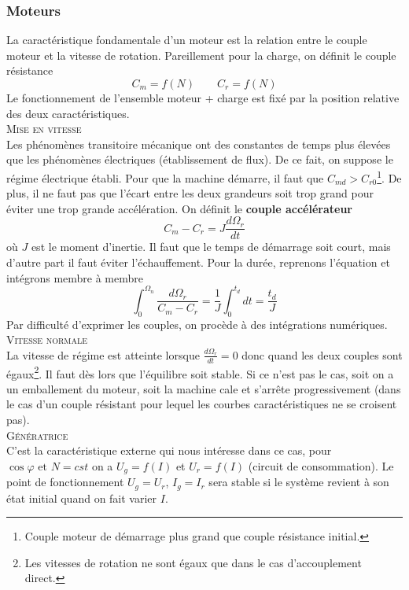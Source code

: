 		\subsubsection{Moteurs}
			La caractéristique fondamentale d'un moteur est la relation entre le couple moteur et la vitesse de rotation. Pareillement pour la charge, on définit le couple résistance 
			\begin{equation}
				C_m = f(N) \qquad C_r = f(N)
			\end{equation}
			Le fonctionnement de l'ensemble moteur + charge est fixé par la position relative des deux caractéristiques. \\
			
			\textsc{Mise en vitesse}\\
				Les phénomènes transitoire mécanique ont des constantes de temps plus élevées que les phénomènes électriques (établissement de flux). De ce fait, on suppose le régime électrique établi. Pour que la machine démarre, il faut que $C_{md} > C_{r0}$\footnote{Couple moteur de démarrage plus grand que couple résistance initial.}. De plus, il ne faut pas que l'écart entre les deux grandeurs soit trop grand pour éviter une trop grande accélération. On définit le \textbf{couple accélérateur}
				\begin{equation}
					C_m - C_r = J\frac{d\Omega _r}{dt}
				\end{equation}
	où $J$ est le moment d'inertie. Il faut que le temps de démarrage soit court, mais d'autre part il faut éviter l'échauffement. Pour la durée, reprenons l'équation et intégrons membre à membre
	\begin{equation}
		\int _0^{\Omega _n} \frac{d\Omega _r}{C_m	- C_r} = \frac{1}{J}\int _0 ^{t_d} dt = \frac{t_d}{J}
	\end{equation}
	Par difficulté d'exprimer les couples, on procède à des intégrations numériques.\\
	
	\textsc{Vitesse normale}\\
	La vitesse de régime est atteinte lorsque $\frac{d\Omega _r}{dt} = 0$ donc quand les deux couples sont égaux\footnote{Les vitesses de rotation ne sont égaux que dans le cas d'accouplement direct.}. Il faut dès lors que l'équilibre soit stable. Si ce n'est pas le cas, soit on a un emballement du moteur, soit la machine cale et s'arrête progressivement (dans le cas d'un couple résistant pour lequel les courbes caractéristiques ne se croisent pas). \\
	
	\textsc{Génératrice}\\
	C'est la caractéristique externe qui nous intéresse dans ce cas, pour $\cos \varphi\text{ et }N = cst$ on a $U_g = f(I)$ et $U_r = f(I)$ (circuit de consommation). Le point de fonctionnement $U_g = U_r$, $I_g = I_r$ sera stable si le système revient à son état initial quand on fait varier $I$. 
		
		
		
		
		
		
		
		
		
		
		
		
		
		
